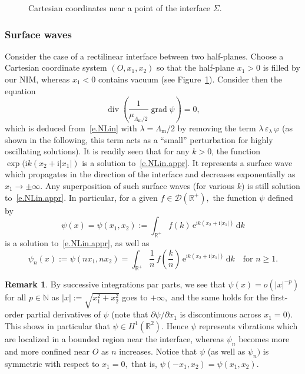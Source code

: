 \documentclass[10pt]{amsart}
\theoremstyle{definition}
\newtheorem{rema}[cdrthm]{Remark}
\DeclareMathOperator{\Div}{div}
\DeclareMathOperator{\grad}{grad}
\newcommand{\epsl}{\varepsilon}
\newcommand{\calD}{\mathcal{D}}
\newcommand{\bbN}{\mathbb{N}}
\newcommand{\bbR}{\mathbb{R}}
\newcommand{\rmd}{{\mathrm{d}}}
\newcommand{\rme}{{\mathrm{e}}}
\newcommand{\rmi}{{\mathrm{i}}}
\newcommand{\Lm}{{\Lambda_{\mathrm{m}}}}
\begin{document}
\begin{figure}[!t]
\begin{center}
\end{center}
\caption{Cartesian coordinates near a point of the interface $\Sigma.$}\label{f.surf-res}
\end{figure}

\subsubsection{Surface waves}
Consider the case of a rectilinear interface between two half-planes. Choose a Cartesian coordinate system $(O,x_1,x_2)$ so that the half-plane $x_1 > 0$ is filled by our NIM, whereas $x_1 < 0$ contains vacuum (see Figure~\ref{f.surf-res}). Consider then the equation
\begin{equation}\label{e.NLin.appr}
\Div \left(\frac{1}{\mu_{\Lm/2}} \grad \psi \right) = 0,
\end{equation}
which is deduced from~\eqref{e.NLin} with $\lambda = \Lm/2$ by removing the term $\lambda\,\epsl_\lambda\,\varphi$ (as shown in the following, this term acts as a ``small'' perturbation for highly oscillating solutions). It is readily seen that for any $k>0$, the function $\exp(\rmi k(x_2 + \rmi |x_1|)$ is a solution to~\eqref{e.NLin.appr}. It represents a surface wave which propagates in the direction of the interface and decreases exponentially as $x_1 \to \pm\infty.$ Any superposition of such surface waves (for various $k)$ is still solution to~\eqref{e.NLin.appr}. In particular, for a given $f \in \calD(\bbR^+),$ the function $\psi$ defined by
\[
\psi(x) = \psi(x_1,x_2) :=
\int_{\bbR^+} f(k)\,\rme^{\rmi k(x_2 + \rmi |x_1|)}\, \rmd k
\]
is a solution to~\eqref{e.NLin.appr}, as well as
\[
\psi_n(x) := \psi(nx_1,nx_2) =
\int_{\bbR^+} \frac{1}{n}\,f\left(\frac{k}{n}\right)\,\rme^{\rmi k(x_2 + \rmi |x_1|)}\, \rmd k
\quad\text{for }n \geq 1.
\]

\begin{rema}\label{r.surf-res}
By successive integrations par parts, we see that $\psi(x) = o(|x|^{-p})$ for all $p \in \bbN$ as $|x| := \sqrt{x_1^2 + x_2^2}$ goes to $+\infty,$ and the same holds for the first-order partial derivatives of $\psi$ (note that $\partial\psi/\partial x_1$ is discontinuous across $x_1=0).$ This shows in particular that $\psi \in H^1(\bbR^2).$ Hence $\psi$ represents vibrations which are localized in a bounded region near the interface, whereas $\psi_n$ becomes more and more confined near $O$ as $n$ increases. Notice that $\psi$ (as well as $\psi_n)$ is symmetric with respect to $x_1=0,$ that is, $\psi(-x_1,x_2) = \psi(x_1,x_2).$
\end{rema}
\end{document}
